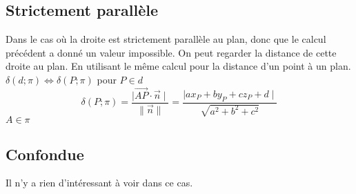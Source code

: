 \documentclass[12pt,a4paper]{report}
\begin{document}
	\subsection*{Strictement parallèle}
	Dans le cas où la droite est strictement parallèle au plan, donc que le calcul précédent a donné un valeur impossible. On peut regarder la distance de cette droite au plan. En utilisant le même calcul pour la distance d'un point à un plan. $\delta(d;\pi)\Leftrightarrow\delta(P;\pi)$ pour $P \in d$ \[ \delta(P;\pi) = \dfrac{\mid \overrightarrow{AP}\cdot \overrightarrow{n}\mid}{\|\overrightarrow{n}\|} = \dfrac{\mid ax_P + by_P + cz_P + d \mid}{\sqrt{a^2+b^2+c^2}} \] $A \in \pi$ 
	\subsection*{Confondue}
	Il n'y a rien d'intéressant à voir dans ce cas.
	
\end{document}
